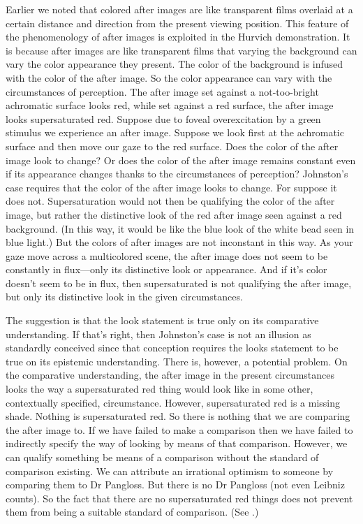 \documentclass[12pt]{article}
\begin{document}
Earlier we noted that colored after images are like transparent films overlaid at a certain distance and direction from the present viewing position. This feature of the phenomenology of after images is exploited in the Hurvich demonstration. It is because after images are like transparent films that varying the background can vary the color appearance they present. The color of the background is infused with the color of the after image. So the color appearance can vary with the circumstances of perception. The after image set against a not-too-bright achromatic surface looks red, while set against a red surface, the after image looks supersaturated red. Suppose due to foveal overexcitation by a green stimulus we experience an after image. Suppose we look first at the achromatic surface and then move our gaze to the red surface. Does the color of the after image look to change? Or does the color of the after image remains constant even if its appearance changes thanks to the circumstances of perception? Johnston's case requires that the color of the after image looks to change. For suppose it does not. Supersaturation would not then be qualifying the color of the after image, but rather the distinctive look of the red after image seen against a red background. (In this way, it would be like the blue look of the white bead seen in blue light.) But the colors of after images are not inconstant in this way. As your gaze move across a multicolored scene, the after image does not seem to be constantly in flux---only its distinctive look or appearance. And if it's color doesn't seem to be in flux, then supersaturated is not qualifying the after image, but only its distinctive look in the given circumstances.

The suggestion is that the look statement is true only on its comparative understanding. If that's right, then Johnston's case is not an illusion as standardly conceived since that conception requires the looks statement to be true on its epistemic understanding. There is, however, a potential problem. On the comparative understanding, the after image in the present circumstances looks the way a supersaturated red thing would look like in some other, contextually specified, circumstance. However, supersaturated red is a missing shade. Nothing is supersaturated red. So there is nothing that we are comparing the after image to. If we have failed to make a comparison then we have failed to indirectly specify the way of looking by means of that comparison. However, we can qualify something be means of a comparison without the standard of comparison existing. We can attribute an irrational optimism to someone by comparing them to Dr Pangloss. But there is no Dr Pangloss (not even Leibniz counts). So the fact that there are no supersaturated red things does not prevent them from being a suitable standard of comparison. (See \citealt[89]{Jackson:1977fk}.)
\end{document}
